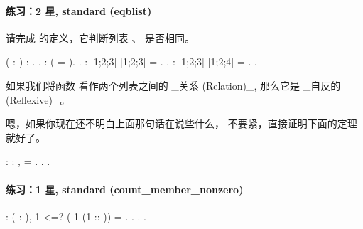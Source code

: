 \documentclass[12pt]{report}
\begin{document}
{{{\paragraph{练习：2 星, standard (eqblist)}



  请完成  的定义，它判断列表 、 是否相同。
\begin{coqdoccode}
\coqdocemptyline
\coqdocnoindent
{}  (  : ) : \coqdoceol
\coqdocindent{1.00em}
.\coqdoceol
\coqdocnoindent
{}.\coqdoceol
\coqdocemptyline
\coqdocnoindent
{}  :\coqdoceol
\coqdocindent{1.00em}
(   = ).\coqdoceol
\coqdocnoindent
{}.\coqdoceol
\coqdocemptyline
\coqdocnoindent
{}  :\coqdoceol
\coqdocindent{1.00em}
 [1;2;3] [1;2;3] = .\coqdoceol
\coqdocnoindent
{}.\coqdoceol
\coqdocemptyline
\coqdocnoindent
{}  :\coqdoceol
\coqdocindent{1.00em}
 [1;2;3] [1;2;4] = .\coqdoceol
\coqdocnoindent
{}.\coqdoceol
\coqdocemptyline
\end{coqdoccode}
  如果我们将函数  看作两个列表之间的 \_关系 (Relation)\_,
  那么它是 \_自反的 (Reflexive)\_。


  嗯，如果你现在还不明白上面那句话在说些什么，
  不要紧，直接证明下面的定理  就好了。 
\begin{coqdoccode}
\coqdocnoindent
{}  : \coqdockw{\ensuremath{\forall}}  : ,\coqdoceol
\coqdocindent{1.00em}
 =   .\coqdoceol
\coqdocnoindent
{}.\coqdoceol
\coqdocnoindent
{}.\coqdoceol
\coqdocemptyline
\end{coqdoccode}
\paragraph{练习：1 星, standard (count\_member\_nonzero)}

\begin{coqdoccode}
\coqdocnoindent
{}  : \coqdockw{\ensuremath{\forall}} ( : ),\coqdoceol
\coqdocindent{1.00em}
1 <=? ( 1 (1 :: )) = .\coqdoceol
\coqdocnoindent
{}.\coqdoceol
\coqdocnoindent
{}.\coqdoceol
\coqdocemptyline
\coqdocnoindent
{} . \end{coqdoccode}
}}}
\end{document}
